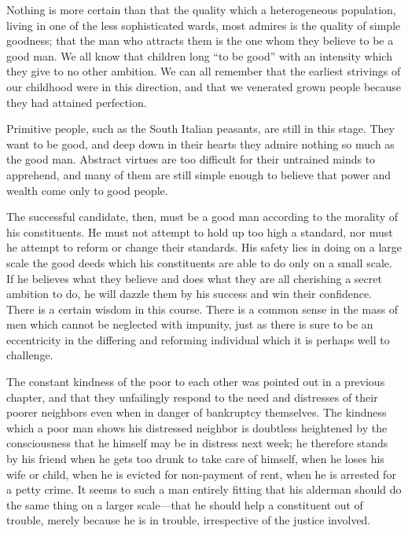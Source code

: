 \documentclass[]{article}
\begin{document}
\begin{sectionbody}
\addamsparagraph Nothing is more certain than that the quality which a heterogeneous
population, living in one of the less sophisticated wards, most admires
is the quality of simple goodness; that the man who attracts them is the
one whom they believe to be a good man. We all know that children long
``to be good'' with an intensity which they give to no other ambition. We
can all remember that the earliest strivings of our childhood were in
this direction, and that we venerated grown people because they had
attained perfection.

\addamsparagraph Primitive people, such as the South Italian peasants, are still in this
stage. They want to be good, and deep down in their hearts they admire
nothing so much as the good man. Abstract virtues are too difficult for
their untrained minds to apprehend, and many of them are still simple
enough to believe that power and wealth come only to good people.

\addamsparagraph The successful candidate, then, must be a good man according to the
morality of his constituents. He must not attempt to hold up too high a
standard, nor must he attempt to reform or change their standards. His
safety lies in doing on a large scale the good deeds which his
constituents are able to do only on a small scale. If he believes what
they believe and does what they are all cherishing a secret ambition to
do, he will dazzle them by his success and win their confidence. There
is a certain wisdom in this course. There is a common sense in the mass
of men which cannot be neglected with impunity, just as there is sure to
be an eccentricity in the differing and reforming individual which it is
perhaps well to challenge.

\addamsparagraph The constant kindness of the poor to each other was pointed out in a
previous chapter, and that they unfailingly respond to the need and
distresses of their poorer neighbors even when in danger of bankruptcy
themselves. The kindness which a poor man shows his distressed neighbor
is doubtless heightened by the consciousness that he himself may be in
distress next week; he therefore stands by his friend when he gets too
drunk to take care of himself, when he loses his wife or child, when he
is evicted for non-payment of rent, when he is arrested for a petty
crime. It seems to such a man entirely fitting that his alderman should
do the same thing on a larger scale---that he should help a constituent
out of trouble, merely because he is in trouble, irrespective of the
justice involved.


\end{sectionbody}
\end{document}
